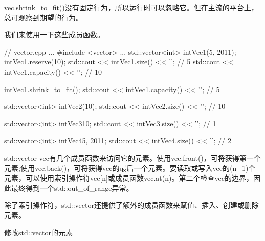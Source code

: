 vec.shrink\_to\_fit()没有固定行为，所以运行时可以忽略它。但在主流的平台上，总可观察到期望的行为。

我们来使用一下这些成员函数。


\begin{cpp}
// vector.cpp
...
#include <vector>
...
std::vector<int> intVec1(5, 2011);
intVec1.reserve(10);
std::cout << intVec1.size() << '\n'; // 5
std::cout << intVec1.capacity() << '\n'; // 10

intVec1.shrink_to_fit();
std::cout << intVec1.capacity() << '\n'; // 5

std::vector<int> intVec2(10);
std::cout << intVec2.size() << '\n'; // 10

std::vector<int> intVec3{10};
std::cout << intVec3.size() << '\n'; // 1

std::vector<int> intVec4{5, 2011};
std::cout << intVec4.size() << '\n'; // 2
\end{cpp}

std::vector vec有几个成员函数来访问它的元素。使用vec.front()，可将获得第一个元素;使用vec.back()，可将获得vec的最后一个元素。要读取或写入vec的(n+1)个元素，可以使用索引操作符vec[n]或成员函数vec.at(n)。第二个检查vec的边界，因此最终得到一个std::out\_of\_range异常。

除了索引操作符，std::vector还提供了额外的成员函数来赋值、插入、创建或删除元素。

\begin{center}
修改std::vector的元素
\end{center}

